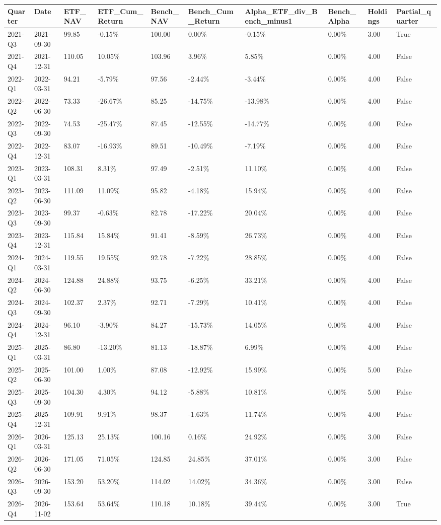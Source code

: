 \begin{longtable}{llllllllll}
Quarter & Date & ETF\_NAV & ETF\_Cum\_Return & Bench\_NAV & Bench\_Cum\_Return & Alpha\_ETF\_div\_Bench\_minus1 & Bench\_Alpha & Holdings & Partial\_quarter \\
\hline
2021-Q3 & 2021-09-30 & 99.85 & -0.15\% & 100.00 & 0.00\% & -0.15\% & 0.00\% & 3.00 & True \\
2021-Q4 & 2021-12-31 & 110.05 & 10.05\% & 103.96 & 3.96\% & 5.85\% & 0.00\% & 4.00 & False \\
2022-Q1 & 2022-03-31 & 94.21 & -5.79\% & 97.56 & -2.44\% & -3.44\% & 0.00\% & 4.00 & False \\
2022-Q2 & 2022-06-30 & 73.33 & -26.67\% & 85.25 & -14.75\% & -13.98\% & 0.00\% & 4.00 & False \\
2022-Q3 & 2022-09-30 & 74.53 & -25.47\% & 87.45 & -12.55\% & -14.77\% & 0.00\% & 4.00 & False \\
2022-Q4 & 2022-12-31 & 83.07 & -16.93\% & 89.51 & -10.49\% & -7.19\% & 0.00\% & 4.00 & False \\
2023-Q1 & 2023-03-31 & 108.31 & 8.31\% & 97.49 & -2.51\% & 11.10\% & 0.00\% & 4.00 & False \\
2023-Q2 & 2023-06-30 & 111.09 & 11.09\% & 95.82 & -4.18\% & 15.94\% & 0.00\% & 4.00 & False \\
2023-Q3 & 2023-09-30 & 99.37 & -0.63\% & 82.78 & -17.22\% & 20.04\% & 0.00\% & 4.00 & False \\
2023-Q4 & 2023-12-31 & 115.84 & 15.84\% & 91.41 & -8.59\% & 26.73\% & 0.00\% & 4.00 & False \\
2024-Q1 & 2024-03-31 & 119.55 & 19.55\% & 92.78 & -7.22\% & 28.85\% & 0.00\% & 4.00 & False \\
2024-Q2 & 2024-06-30 & 124.88 & 24.88\% & 93.75 & -6.25\% & 33.21\% & 0.00\% & 4.00 & False \\
2024-Q3 & 2024-09-30 & 102.37 & 2.37\% & 92.71 & -7.29\% & 10.41\% & 0.00\% & 4.00 & False \\
2024-Q4 & 2024-12-31 & 96.10 & -3.90\% & 84.27 & -15.73\% & 14.05\% & 0.00\% & 4.00 & False \\
2025-Q1 & 2025-03-31 & 86.80 & -13.20\% & 81.13 & -18.87\% & 6.99\% & 0.00\% & 4.00 & False \\
2025-Q2 & 2025-06-30 & 101.00 & 1.00\% & 87.08 & -12.92\% & 15.99\% & 0.00\% & 5.00 & False \\
2025-Q3 & 2025-09-30 & 104.30 & 4.30\% & 94.12 & -5.88\% & 10.81\% & 0.00\% & 5.00 & False \\
2025-Q4 & 2025-12-31 & 109.91 & 9.91\% & 98.37 & -1.63\% & 11.74\% & 0.00\% & 4.00 & False \\
2026-Q1 & 2026-03-31 & 125.13 & 25.13\% & 100.16 & 0.16\% & 24.92\% & 0.00\% & 3.00 & False \\
2026-Q2 & 2026-06-30 & 171.05 & 71.05\% & 124.85 & 24.85\% & 37.01\% & 0.00\% & 3.00 & False \\
2026-Q3 & 2026-09-30 & 153.20 & 53.20\% & 114.02 & 14.02\% & 34.36\% & 0.00\% & 3.00 & False \\
2026-Q4 & 2026-11-02 & 153.64 & 53.64\% & 110.18 & 10.18\% & 39.44\% & 0.00\% & 3.00 & True \\
\end{longtable}
